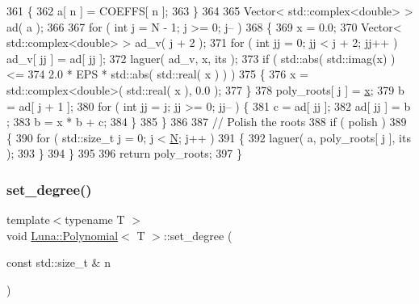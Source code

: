 \begin{DoxyCode}
361         \{
362             a[ n ] = COEFFS[ n ];
363         \}
364 
365         Vector< std::complex<double> > ad( a );
366 
367         \textcolor{keywordflow}{for} ( \textcolor{keywordtype}{int} j = N - 1; j >= 0; j-- )
368         \{
369             x = 0.0;
370             Vector< std::complex<double> > ad\_v( j + 2 );
371             \textcolor{keywordflow}{for} ( \textcolor{keywordtype}{int} jj = 0; jj < j + 2; jj++ ) ad\_v[ jj ] = ad[ jj ];
372             laguer( ad\_v, x, its );
373             \textcolor{keywordflow}{if} ( std::abs( std::imag(x) ) <=
374                      2.0 * EPS * std::abs( std::real( x ) ) )
375             \{
376                 x = std::complex<double>( std::real( x ), 0.0 );
377             \}
378             poly\_roots[ j ] = \hyperlink{namespaceHeat__plot_aa88370c16b85b784ccbde3ed88bc1991}{x};
379             b = ad[ j + 1 ];
380             \textcolor{keywordflow}{for} ( \textcolor{keywordtype}{int} jj = j; jj >= 0; jj-- ) \{
381                 c = ad[ jj ];
382                 ad[ jj ] = b ;
383                 b = x * b + c;
384             \}
385         \}
386 
387         \textcolor{comment}{// Polish the roots}
388         \textcolor{keywordflow}{if} ( polish )
389         \{
390             \textcolor{keywordflow}{for} ( std::size\_t j = 0; j < \hyperlink{namespaceHeat__plot_a7d050092798e28458a263710837bda77}{N}; j++ )
391             \{
392                 laguer( a, poly\_roots[ j ], its );
393             \}
394         \}
395 
396         \textcolor{keywordflow}{return} poly\_roots;
397     \}
\end{DoxyCode}
\mbox{\label{classLuna_1_1Polynomial_ad1afdd49b8020cc85a51c889b7454889}} 
\subsubsection{\texorpdfstring{set\+\_\+degree()}{set\_degree()}}
{\footnotesize\ttfamily template$<$typename T $>$ \\
void \hyperlink{classLuna_1_1Polynomial}{Luna\+::\+Polynomial}$<$ T $>$\+::set\+\_\+degree (\begin{DoxyParamCaption}\item[{const std\+::size\+\_\+t \&}]{n }\end{DoxyParamCaption})\hspace{0.3cm}{\ttfamily [inline]}}



